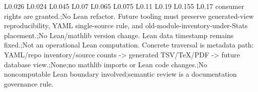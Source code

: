 \begin{longtable}{L{0.026\linewidth} L{0.024\linewidth} L{0.045\linewidth} L{0.07\linewidth} L{0.065\linewidth} L{0.075\linewidth} L{0.11\linewidth} L{0.19\linewidth} L{0.155\linewidth} L{0.17\linewidth}}
consumer rights are granted.;\newline No Lean refactor. Future tooling must preserve generated-view reproducibility, YAML single-source rule, and old-module-inventory-under-Stats placement.;\newline No Lean/\allowbreak{}mathlib version change. Lean data timestamp remains fixed.;\newline Not an operational Lean computation. Concrete traversal is metadata path: YAML/\allowbreak{}repo inventory/\allowbreak{}source counts -> generated TSV/\allowbreak{}TeX/\allowbreak{}PDF -> future database view.;\newline None;\newline no mathlib imports or Lean code changes.;\newline No noncomputable Lean boundary involved;\newline semantic review is a documentation governance rule.\\
\hline
\addlinespace[0.24em]

\end{longtable}
